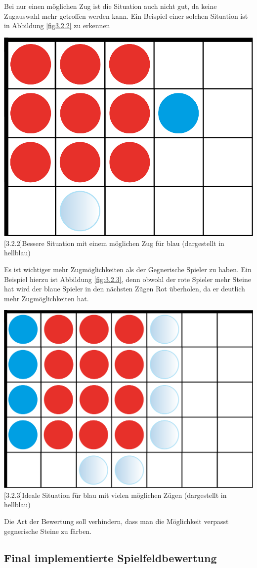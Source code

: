\documentclass[12pt,a4paper,bibliography=totocnumbered,listof=totocnumbered]{scrartcl}
\begin{document}
   Bei nur einen möglichen Zug ist die Situation auch nicht gut, da keine Zugauswahl mehr getroffen werden kann. Ein Beispiel einer solchen Situation ist in Abbildung \ref{fig3.2.2} zu erkennen

   	\vspace{1em}
	\begin{minipage}{\linewidth}
		\centering
		\includegraphics[width=0.33\linewidth]{pics/Kapitel_3/Kapitel_3_pic6.png}
		[3.2.2]{Bessere Situation mit einem möglichen Zug für blau (dargestellt in hellblau)}
		\label{fig:3.2.2}
	\end{minipage}
	\vspace{1em}
	
   Es ist wichtiger mehr Zugmöglichkeiten als der Gegnerische Spieler zu haben. Ein Beispiel hierzu ist Abbildung \ref{fig:3.2.3}, denn obwohl der rote Spieler mehr Steine hat wird der blaue Spieler in den nächsten Zügen Rot überholen, da er deutlich mehr Zugmöglichkeiten hat.

   	\vspace{1em}
	\begin{minipage}{\linewidth}
		\centering
		\includegraphics[width=0.33\linewidth]{pics/Kapitel_3/Kapitel_3_pic7.png}
		[3.2.3]{Ideale Situation für blau mit vielen möglichen Zügen (dargestellt in hellblau)}
		\label{fig:3.2.3}
	\end{minipage}
	\vspace{1em}
	
    Die Art der Bewertung soll verhindern, dass man die Möglichkeit verpasst gegnerische Steine zu färben.

    \subsection{Final implementierte Spielfeldbewertung}
    \vspace{1em}
\end{document}
